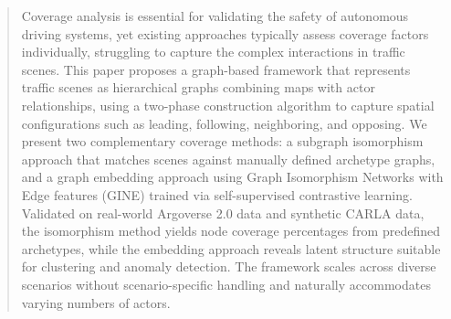 \begin{abstract}
Coverage analysis is essential for validating the safety of autonomous driving systems, yet existing approaches typically assess coverage factors individually, struggling to capture the complex interactions in traffic scenes.
This paper proposes a graph-based framework that represents traffic scenes as hierarchical graphs combining maps with actor relationships, using a two-phase construction algorithm to capture spatial configurations such as leading, following, neighboring, and opposing.
We present two complementary coverage methods: a subgraph isomorphism approach that matches scenes against manually defined archetype graphs, and a graph embedding approach using Graph Isomorphism Networks with Edge features (GINE) trained via self-supervised contrastive learning.
Validated on real-world Argoverse 2.0 data and synthetic CARLA data, the isomorphism method yields node coverage percentages from predefined archetypes, while the embedding approach reveals latent structure suitable for clustering and anomaly detection.
The framework scales across diverse scenarios without scenario-specific handling and naturally accommodates varying numbers of actors.

\end{abstract}
